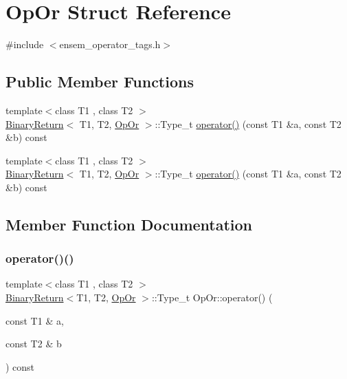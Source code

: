 \hypertarget{structOpOr}{}\section{Op\+Or Struct Reference}
\label{structOpOr}


{\ttfamily \#include $<$ensem\+\_\+operator\+\_\+tags.\+h$>$}

\subsection*{Public Member Functions}
\begin{DoxyCompactItemize}
\item 
{\footnotesize template$<$class T1 , class T2 $>$ }\\\mbox{\hyperlink{structBinaryReturn}{Binary\+Return}}$<$ T1, T2, \mbox{\hyperlink{structOpOr}{Op\+Or}} $>$\+::Type\+\_\+t \mbox{\hyperlink{structOpOr_a01b11c55d051ff847a53aab673a65582}{operator()}} (const T1 \&a, const T2 \&b) const
\item 
{\footnotesize template$<$class T1 , class T2 $>$ }\\\mbox{\hyperlink{structBinaryReturn}{Binary\+Return}}$<$ T1, T2, \mbox{\hyperlink{structOpOr}{Op\+Or}} $>$\+::Type\+\_\+t \mbox{\hyperlink{structOpOr_a01b11c55d051ff847a53aab673a65582}{operator()}} (const T1 \&a, const T2 \&b) const
\end{DoxyCompactItemize}


\subsection{Member Function Documentation}
\mbox{\label{structOpOr_a01b11c55d051ff847a53aab673a65582}} 
\subsubsection{\texorpdfstring{operator()()}{operator()()}\hspace{0.1cm}{\footnotesize\ttfamily [1/2]}}
{\footnotesize\ttfamily template$<$class T1 , class T2 $>$ \\
\mbox{\hyperlink{structBinaryReturn}{Binary\+Return}}$<$T1, T2, \mbox{\hyperlink{structOpOr}{Op\+Or}} $>$\+::Type\+\_\+t Op\+Or\+::operator() (\begin{DoxyParamCaption}\item[{const T1 \&}]{a,  }\item[{const T2 \&}]{b }\end{DoxyParamCaption}) const\hspace{0.3cm}{\ttfamily [inline]}}

